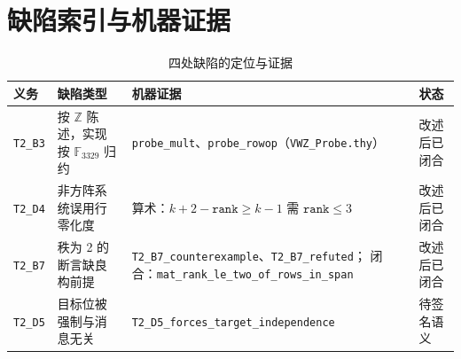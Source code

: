\documentclass[UTF8,fontset=windows,zihao=-4,a4paper]{ctexart}
\newcommand{\code}[1]{\texttt{#1}}
\newcommand{\Fq}{\mathbb{F}_{3329}}
\begin{document}
\appendix
\section{缺陷索引与机器证据}
\begin{table}[htbp]
\centering
\small
\caption{四处缺陷的定位与证据}
\setlength{\tabcolsep}{4pt}
\begin{tabular}{>{\raggedright\arraybackslash}p{2.0cm}>{\raggedright\arraybackslash}p{4.1cm}>{\raggedright\arraybackslash}p{4.9cm}>{\raggedright\arraybackslash}p{2.9cm}}
\toprule
义务 & 缺陷类型 & 机器证据 & 状态 \\
\midrule
\code{T2\_B3} & 按 $\mathbb{Z}$ 陈述，实现按 $\Fq$ 归约 &
\code{probe\_mult}、\code{probe\_rowop}（\code{VWZ\_Probe.thy}） &
改述后已闭合 \\
\code{T2\_D4} & 非方阵系统误用行零化度 &
算术：$k+2-\code{rank}\ge k-1$ 需 $\code{rank}\le 3$ &
改述后已闭合 \\
\code{T2\_B7} & 秩为 2 的断言缺良构前提 &
\code{T2\_B7\_counterexample}、\code{T2\_B7\_refuted}；
闭合：\code{mat\_rank\_le\_two\_of\_rows\_}\newline\code{in\_span} &
改述后已闭合 \\
\code{T2\_D5} & 目标位被强制与消息无关 &
\code{T2\_D5\_forces\_}\newline\code{target\_independence} &
待签名语义 \\
\bottomrule
\end{tabular}
\end{table}
\end{document}
